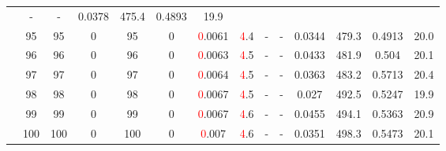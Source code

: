 \begin{table}[htb]
{\begin{tabular}{|c|c|c|c|c|c|c|c|c|c|c|c|c|c|}
 & - & -
 & 0.0378 & 475.4
 & 0.4893 & 19.9
 \\
 & 
95 & 95 & 0 & 95 & 0
 & \textcolor{red}0.0061 & \textcolor{red}4.4
 & - & -
 & 0.0344 & 479.3
 & 0.4913 & 20.0
 \\
 & 
96 & 96 & 0 & 96 & 0
 & \textcolor{red}0.0063 & \textcolor{red}4.5
 & - & -
 & 0.0433 & 481.9
 & 0.504 & 20.1
 \\
 & 
97 & 97 & 0 & 97 & 0
 & \textcolor{red}0.0064 & \textcolor{red}4.5
 & - & -
 & 0.0363 & 483.2
 & 0.5713 & 20.4
 \\
 & 
98 & 98 & 0 & 98 & 0
 & \textcolor{red}0.0067 & \textcolor{red}4.5
 & - & -
 & 0.027 & 492.5
 & 0.5247 & 19.9
 \\
 & 
99 & 99 & 0 & 99 & 0
 & \textcolor{red}0.0067 & \textcolor{red}4.6
 & - & -
 & 0.0455 & 494.1
 & 0.5363 & 20.9
 \\
 & 
100 & 100 & 0 & 100 & 0
 & \textcolor{red}0.007 & \textcolor{red}4.6
 & - & -
 & 0.0351 & 498.3
 & 0.5473 & 20.1
 \\
\hline
\end{tabular}}
\end{table}